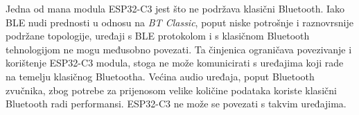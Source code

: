 Jedna od mana modula ESP32-C3 jest što ne podržava klasični Bluetooth. Iako BLE nudi prednosti u odnosu na \textit{BT Classic}, poput niske potrošnje i raznovrsnije podržane topologije, uređaji s BLE protokolom i s klasičnom Bluetooth tehnologijom ne mogu međusobno povezati. Ta činjenica ograničava povezivanje i korištenje ESP32-C3 modula, stoga ne može komunicirati s uređajima koji rade na temelju klasičnog Bluetootha. Većina audio uređaja, poput Bluetooth zvučnika, zbog potrebe za prijenosom velike količine podataka koriste klasični Bluetooth radi performansi. ESP32-C3 ne može se povezati s takvim uređajima.



\eject